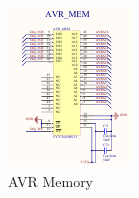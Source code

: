 \begin{figure}[h]
  \centering
  \includegraphics[width=\textwidth]{fig/pcb/schematics/pcbschematic_avrmem.pdf}
  \caption{AVR Memory}
  \label{fig:schematic-pcb-avrmem}
\end{figure}
